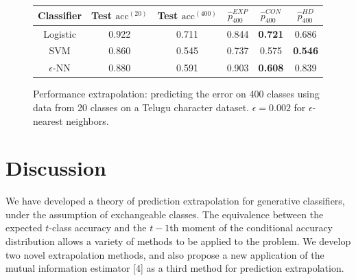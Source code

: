 \documentclass{article}
\begin{document}
\begin{figure}
\centering
\begin{tabular}{|c||c|c|c|c|c|}\hline
Classifier & Test $\text{acc}^{(20)}$ & Test $\text{acc}^{(400)}$ & $\hat{p}^{EXP}_{400}$ & $\hat{p}^{CON}_{400}$ & $\hat{p}^{HD}_{400}$\\ \hline
Logistic & 0.922 & 0.711 & 0.844 & \textbf{0.721} & 0.686 \\ \hline
SVM & 0.860 & 0.545 & 0.737 & 0.575 & \textbf{0.546} \\ \hline
$\epsilon$-NN & 0.880 & 0.591 & 0.903 & \textbf{0.608} & 0.839\\ \hline
\end{tabular}
\caption{Performance extrapolation: predicting the error on 400 classes using data from 20 classes on a Telugu character dataset.
$\epsilon = 0.002$ for $\epsilon$-nearest neighbors.}
\end{figure}



\section{Discussion}

We have developed a theory of prediction extrapolation for generative classifiers,
under the assumption of exchangeable classes.  The equivalence between
the expected $t$-class accuracy and the $t-1$th moment of the conditional accuracy distribution
allows a variety of methods to be applied to the problem.  We develop two novel extrapolation methods,
and also propose a new application of the mutual information estimator [4] as a third method for
prediction extrapolation.
\end{document}
